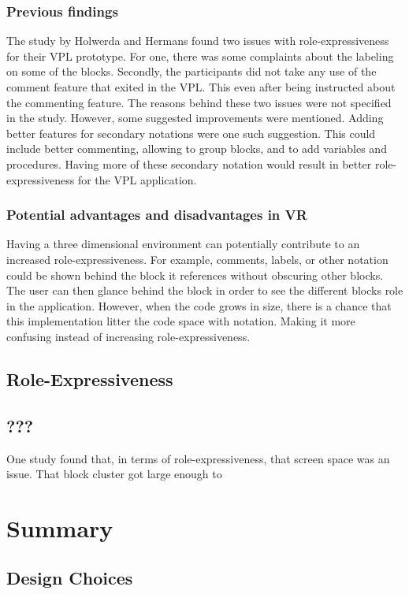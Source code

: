 \documentclass{sigchi}
\begin{document}
\subsubsection{Previous findings}
The study by Holwerda and Hermans found two issues with role-expressiveness for their VPL prototype. For one, there was some complaints about the labeling on some of the blocks. Secondly, the participants did not take any use of the comment feature that exited in the VPL. This even after being instructed about the commenting feature. The reasons behind these two issues were not specified in the study. However, some suggested improvements were mentioned. Adding better features for secondary notations were one such suggestion. This could include better commenting, allowing to group blocks, and to add variables and procedures. Having more of these secondary notation would result in better role-expressiveness for the VPL application.

\subsubsection{Potential advantages and disadvantages in VR}
Having a three dimensional environment can potentially contribute to an increased role-expressiveness. For example, comments, labels, or other notation could be shown behind the block it references without obscuring other blocks. The user can then glance behind the block in order to see the different blocks role in the application. However, when the code grows in size, there is a chance that this implementation litter the code space with notation. Making it more confusing instead of increasing role-expressiveness.

\subsection{Role-Expressiveness}

\subsection{???}
One study found that, in terms of role-expressiveness, that screen space was an issue. That block cluster got large enough to

\section{Summary}
\subsection{Design Choices}
\end{document}
